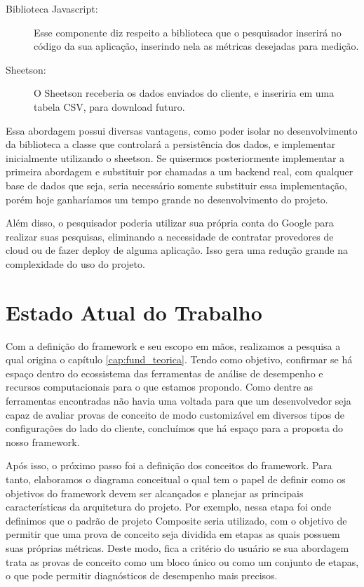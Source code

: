 \documentclass[12pt]{tcc}
\begin{document}
\begin{description}
	\item[Biblioteca Javascript:] Esse componente diz respeito a biblioteca que o pesquisador inserirá no código da sua aplicação, inserindo nela as métricas desejadas para medição.
	
	\item[Sheetson:] O Sheetson receberia os dados enviados do cliente, e inseriria em uma tabela CSV, para download futuro.

\end{description}

Essa abordagem possui diversas vantagens, como poder isolar no desenvolvimento da biblioteca a classe que controlará a persistência dos dados, e implementar inicialmente utilizando o sheetson. Se quisermos posteriormente implementar a primeira abordagem e substituir por chamadas a um backend real, com qualquer base de dados que seja, seria necessário somente substituir essa implementação, porém hoje ganharíamos um tempo grande no desenvolvimento do projeto.

Além disso, o pesquisador poderia utilizar sua própria conta do Google para realizar suas pesquisas, eliminando a necessidade de contratar provedores de cloud ou de fazer deploy de alguma aplicação. Isso gera uma redução grande na complexidade do uso do projeto.


\chapter{Estado Atual do Trabalho}
\label{cap:estado_atual}

Com a definição do framework e seu escopo em mãos, realizamos a pesquisa a qual origina o capítulo \ref{cap:fund_teorica}.
Tendo como objetivo, confirmar se há espaço dentro do ecossistema das ferramentas de análise de desempenho e recursos computacionais para o que estamos propondo.
Como dentre as ferramentas encontradas não havia uma voltada para que um desenvolvedor seja capaz de avaliar provas de conceito de modo customizável em diversos tipos de configurações do lado do cliente, concluímos que há espaço para a proposta do nosso framework.

Após isso, o próximo passo foi a definição dos conceitos do framework.
Para tanto, elaboramos o diagrama conceitual o qual tem o papel de definir como os objetivos do framework devem ser alcançados e planejar as principais características da arquitetura do projeto.
Por exemplo, nessa etapa foi onde definimos que o padrão de projeto Composite seria utilizado, com o objetivo de permitir que uma prova de conceito seja dividida em etapas as quais possuem suas próprias métricas.
Deste modo, fica a critério do usuário se sua abordagem trata as provas de conceito como um bloco único ou como um conjunto de etapas, o que pode permitir diagnósticos de desempenho mais precisos.
\end{document}
